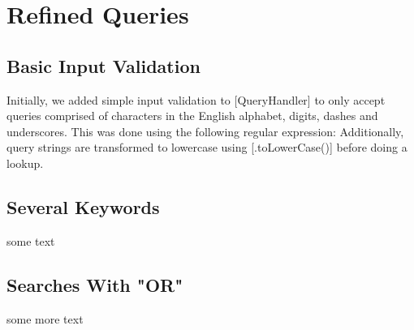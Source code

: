 \section{Refined Queries}

\subsection{Basic Input Validation}
Initially, we added simple input validation to [QueryHandler] to only accept queries comprised of characters in the English alphabet, digits, dashes and underscores. This was done using the following regular expression: %
Additionally, query strings are transformed to lowercase using [.toLowerCase()] before doing a lookup.

\subsection{Several Keywords}
some text

\subsection{Searches With "OR"}
some more text